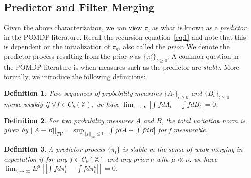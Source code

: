 \documentclass[conference]{IEEEtran}
\newtheorem{definition}{Definition}[section]
\begin{document}
\subsection{Predictor and Filter Merging}




Given the above characterization, we can view \( \pi_t \) as what is known as a \emph{predictor} in the POMDP literature. Recall the recursion equation~\eqref{eq:1} and note that this is dependent on the initialization of \( \pi_0 \), also called the \emph{prior}. We denote the predictor process resulting from the prior \( \nu \) as \( \{\pi_t^\nu \}_{t\ge0} \). A common question in the POMDP literature is when measures such as the predictor are \emph{stable}. More formally, we introduce the following definitions:

\begin{definition}\label{definition:weak_merge}
    Two sequences of probability measures \( \{A_t\}_{t\ge0} \) and \( \{B_t\}_{t\ge0} \) merge weakly if \( \forall f \in C_b(\mathbb{X}) \), we have \( \lim_{t \to \infty} |\int fdA_t - \int fdB_t| = 0\).
\end{definition}

\begin{definition}\label{definition:TV_merge}
    For two probability measures \( A \) and \( B \), the total variation norm is given by \( ||A-B||_{TV} = \sup_{||f||_\infty \le 1} |\int fdA - \int fdB| \) for f measurable.
\end{definition}

\begin{definition}\label{definition:weak_stable}
    A predictor process \(\{\pi_t\}\) is stable in the sense of weak merging in expectation if for any \( f \in C_b(\mathbb{X}) \) and any prior \( \nu \) with \( \mu \ll \nu \), we have \( \lim_{n \to \infty}E^\mu [|\int fd\pi_t^\mu - \int fd\pi_t^\nu|] = 0 \).
\end{definition}
\end{document}
